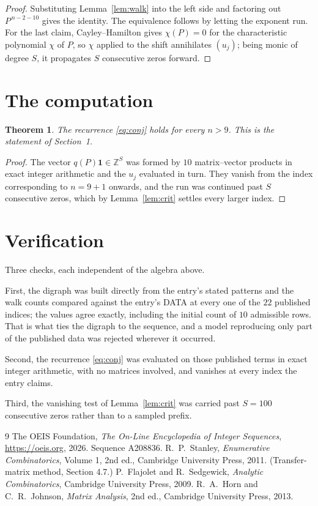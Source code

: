 \documentclass[11pt,a4paper]{article}
\theoremstyle{plain}
\newtheorem{theorem}{Theorem}
\theoremstyle{definition}
\begin{document}
\begin{proof}
Substituting Lemma~\ref{lem:walk} into the left side and factoring out
$P^{\,n-2-10}$ gives the identity. The equivalence follows by letting the exponent
run. For the last claim, Cayley--Hamilton gives $\chi(P)=0$ for the characteristic
polynomial $\chi$ of $P$, so $\chi$ applied to the shift annihilates $(u_j)$; being monic of
degree $S$, it propagates $S$ consecutive zeros forward.
\end{proof}

\section{The computation}

\begin{theorem}
The recurrence \eqref{eq:conj} holds for every $n>9$. This is the statement of
Section~1.
\end{theorem}

\begin{proof}
The vector $q(P)\mathbf{1}\in\mathbb{Z}^{S}$ was formed by $10$ matrix--vector
products in exact integer arithmetic and the $u_j$ evaluated in turn. They vanish from the
index corresponding to $n=9+1$ onwards, and the run was continued past $S$ consecutive
zeros, which by Lemma~\ref{lem:crit} settles every larger index.
\end{proof}

\section{Verification}

Three checks, each independent of the algebra above.

First, the digraph was built directly from the entry's stated patterns and the walk counts
compared against the entry's DATA at every one of the $22$ published indices; the
values agree exactly, including the initial count of $10$ admissible rows. That is
what ties the digraph to the sequence, and a model reproducing only part of the published
data was rejected wherever it occurred.

Second, the recurrence \eqref{eq:conj} was evaluated on those published terms in exact
integer arithmetic, with no matrices involved, and vanishes at every index the entry claims.

Third, the vanishing test of Lemma~\ref{lem:crit} was carried past $S=100$ consecutive
zeros rather than to a sampled prefix.

\begin{thebibliography}{9}
 The OEIS Foundation, \emph{The On-Line Encyclopedia of Integer
Sequences}, \url{https://oeis.org}, 2026. Sequence A208836.
 R.~P.~Stanley, \emph{Enumerative Combinatorics}, Volume 1, 2nd ed.,
Cambridge University Press, 2011. (Transfer-matrix method, Section 4.7.)
 P.~Flajolet and R.~Sedgewick, \emph{Analytic Combinatorics}, Cambridge
University Press, 2009.
 R.~A.~Horn and C.~R.~Johnson, \emph{Matrix Analysis}, 2nd ed., Cambridge
University Press, 2013.
\end{thebibliography}
\end{document}
